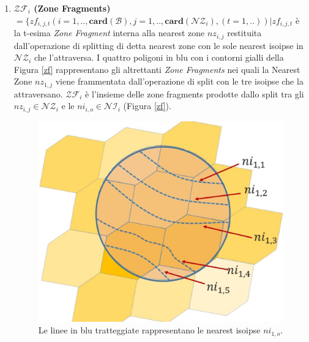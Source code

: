 \begin{enumerate}
	\item \textbf{$\mathcal{ZF}_i$ (Zone Fragments)} $ = \{ zf_{i,j,t} (i=1,..,\mathbf{card}(\mathcal{B}),j=1,..,\mathbf{card}(\mathcal{NZ}_i),(t=1,..))| zf_{i,j,t}  $ è la t-esima \textit{Zone Fragment} interna alla nearest zone $nz_{i,j}$ restituita dall'operazione di splitting di detta nearest zone con le sole nearest isoipse in $\mathcal{NZ}_i $ che l'attraversa.
	I quattro poligoni in blu con i contorni gialli della Figura \ref{zf} rappresentano gli altrettanti \textit{Zone Fragments} nei quali la Nearest Zone $nz_{1,j}$ viene frammentata dall'operazione di split con le tre isoipse che la attraversano. $\mathcal{ZF}_i$ è l'insieme delle zone fragments prodotte dallo split tra gli $nz_{i,j} \in \mathcal{NZ}_i $ e le $ni_{i,o} \in \mathcal{NI}_i$ (Figura \ref{zf}). 
	
	
	\begin{figure}[h]
		\hspace{0.05\linewidth}
		\begin{minipage}[t]{0.40\linewidth}
			\centering
			\includegraphics[width=1\textwidth]{images/ni}
			\caption{Le linee in blu tratteggiate rappresentano le nearest isoipse $ni_{1,o}$.}
			\label{NearestIso}
		\end{minipage}
		\hspace{0.05\linewidth}
		\begin{minipage}[t]{0.40\linewidth}
			\centering

\end{minipage}
\end{figure}
\end{enumerate}

